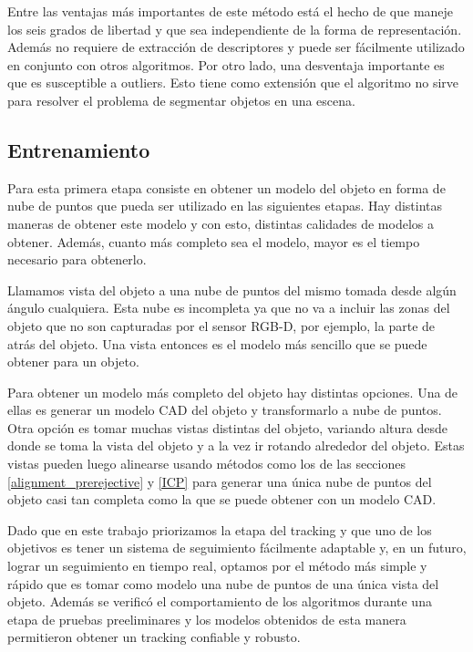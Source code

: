 Entre las ventajas más importantes de este método está el hecho de que maneje los seis grados de libertad y que sea independiente de la forma de representación. Además no requiere de extracción de descriptores y puede ser fácilmente utilizado en conjunto con otros algoritmos. Por otro lado, una desventaja importante es que es susceptible a outliers. Esto tiene como extensión que el algoritmo no sirve para resolver el problema de segmentar objetos en una escena.



\subsection{Entrenamiento}
Para esta primera etapa consiste en obtener un modelo del objeto en forma de nube de puntos que pueda ser utilizado en las siguientes etapas. Hay distintas maneras de obtener este modelo y con esto, distintas calidades de modelos a obtener. Además, cuanto más completo sea el modelo, mayor es el tiempo necesario para obtenerlo.

Llamamos vista del objeto a una nube de puntos del mismo tomada desde algún ángulo cualquiera. Esta nube es incompleta ya que no va a incluir las zonas del objeto que no son capturadas por el sensor RGB-D, por ejemplo, la parte de atrás del objeto. Una vista entonces es el modelo más sencillo que se puede obtener para un objeto.

Para obtener un modelo más completo del objeto hay distintas opciones. Una de ellas es generar un modelo CAD del objeto y transformarlo a nube de puntos. Otra opción es tomar muchas vistas distintas del objeto, variando altura desde donde se toma la vista del objeto y a la vez ir rotando alrededor del objeto. Estas vistas pueden luego alinearse usando métodos como los de las secciones \ref{alignment_prerejective} y \ref{ICP} para generar una única nube de puntos del objeto casi tan completa como la que se puede obtener con un modelo CAD.

Dado que en este trabajo priorizamos la etapa del tracking y que uno de los objetivos es tener un sistema de seguimiento fácilmente adaptable y, en un futuro, lograr un seguimiento en tiempo real, optamos por el método más simple y rápido que es tomar como modelo una nube de puntos de una única vista del objeto. Además se verificó el comportamiento de los algoritmos durante una etapa de pruebas preeliminares y los modelos obtenidos de esta manera permitieron obtener un tracking confiable y robusto.

